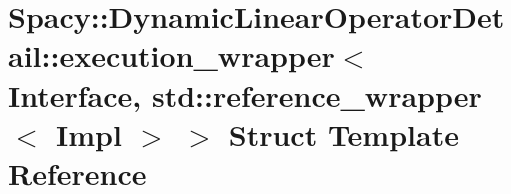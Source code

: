 \hypertarget{structSpacy_1_1DynamicLinearOperatorDetail_1_1execution__wrapper_3_01Interface_00_01std_1_1refer84e715fb48a028921170e9332c09d62f}{\section{\-Spacy\-:\-:\-Dynamic\-Linear\-Operator\-Detail\-:\-:execution\-\_\-wrapper$<$ \-Interface, std\-:\-:reference\-\_\-wrapper$<$ \-Impl $>$ $>$ \-Struct \-Template \-Reference}
\label{structSpacy_1_1DynamicLinearOperatorDetail_1_1execution__wrapper_3_01Interface_00_01std_1_1refer84e715fb48a028921170e9332c09d62f}
}
